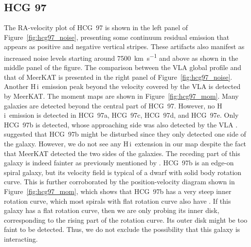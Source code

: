 \documentclass{aa}
\newcommand{\HI}{H\,{\sc i}}
\begin{document}
\subsection{HCG 97}
The RA-velocity plot of HCG~97 is shown in the left panel of Figure~\ref{fig:hcg97_noise}, presenting some continuum residual 
emission that appears as positive and negative vertical stripes. These artifacts also manifest as increased noise levels starting 
around \qty{7500}{km~s^{-1}} and above as shown in the middle panel of the figure. 
The comparison between the VLA global profile and that of MeerKAT is presented in the right panel of Figure~\ref{fig:hcg97_noise}.  
Another \HI\ emission peak beyond the velocity covered by the VLA is detected by MeerKAT. 
The moment maps are shown in Figure~\ref{fig:hcg97_mom}. Many galaxies are detected beyond the central part of HCG~97. 
However, no \HI\ emission is detected in HCG~97a, 
HCG~97c, HCG~97d, and HCG~97e. Only HCG~97b is detected, whose approaching side was also detected by the VLA \citep{2023A&A...670A..21J}. 
\citet{2023A&A...670A..21J} suggested that HCG~97b might be disturbed since they only detected one side of the galaxy. However, we do not 
see any \HI\ extension in our map despite the fact that MeerKAT detected the two sides of the galaxies. The receding part of this galaxy is indeed fainter 
as previously mentioned by \citet{2023A&A...670A..21J}. HCG~97b is an edge-on spiral galaxy, but its velocity field is typical of a dwarf with solid body 
rotation curve. This is further corroborated by the position-velocity diagram shown in Figure~\ref{fig:hcg97_mom}, which shows that HCG~97b has a 
very steep inner rotation curve, which most spirals with flat rotation curve also have \citep{1978PhDT.......195B}. 
If this galaxy has a flat rotation curve, then we are only probing its inner disk, corresponding to the rising part of the rotation curve. 
Its outer disk might be too faint to be detected. Thus, we do not exclude the possibility that this galaxy is interacting. 
 
\end{document}
